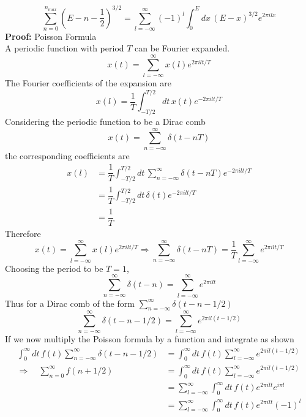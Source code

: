 \documentclass[aps,prb,onecolumn,notitlepage,showpacs,floatfix,superscriptaddress]{revtex4-1}
\begin{document}
\begin{equation}
\sum_{n=0}^{n_{max}}  \left(E - n - \dfrac{1}{2}\right)^{3/2}  = \sum_{l=-\infty}^\infty (-1)^l \int_0^E dx \, (E-x)^{3/2} e^{2\pi i l x}
\end{equation}
\noindent\makebox[\linewidth]{\rule{\textwidth}{0.4pt}}
\textbf{Proof:} Poisson Formula \\
A periodic function with period $T$ can be Fourier expanded.
\begin{equation}
x(t) = \sum_{l=-\infty}^\infty x(l) e^{2\pi i l t/T}
\end{equation}
The Fourier coefficients of the expansion are
\begin{equation}
x(l) = \dfrac{1}{T} \int_{-T/2}^{T/2} dt \, x(t) e^{-2\pi i l t/T}
\end{equation}
Considering the periodic function to be a Dirac comb
\begin{equation}
x(t) = \sum_{n=-\infty}^{\infty} \delta(t-n T)
\end{equation}
the corresponding coefficients are
\begin{equation}
\begin{split}
x(l) &= \dfrac{1}{T} \int_{-T/2}^{T/2} dt \, \sum_{n=-\infty}^{\infty} \delta(t-nT) e^{-2\pi i l t/T} \\
&= \dfrac{1}{T} \int_{-T/2}^{T/2} dt \, \delta(t) e^{-2\pi i l t/T} \\
&=\dfrac{1}{T}
\end{split}
\end{equation}
Therefore
\begin{equation}
x(t) = \sum_{l=-\infty}^\infty x(l) e^{2\pi i l t/T} \Rightarrow \sum_{n=-\infty}^{\infty} \delta(t-nT) = \dfrac{1}{T} \sum_{l=-\infty}^\infty  e^{2\pi i l t/T}
\end{equation}
Choosing the period to be $T=1$,
\begin{equation}
\sum_{n=-\infty}^{\infty} \delta(t-n) = \sum_{l=-\infty}^\infty  e^{2\pi i l t}
\end{equation}
Thus for a Dirac comb of the form $\sum_{n=-\infty}^{\infty} \delta(t-n -1/2) $
\begin{equation}
\sum_{n=-\infty}^{\infty} \delta(t-n-1/2) = \sum_{l=-\infty}^\infty  e^{2\pi i l (t-1/2)}
\end{equation}
If we now multiply the Poisson formula by a function and integrate as shown
\begin{equation}
\begin{split}
\int_0^\infty dt \, f(t) \sum_{n=-\infty}^{\infty} \delta(t-n-1/2) &= \int_0^\infty dt \, f(t) \sum_{l=-\infty}^\infty  e^{2\pi i l (t-1/2)} \\
\Rightarrow \quad  \sum_{n=0}^{\infty} f(n+1/2) & = \int_0^\infty dt \, f(t) \sum_{l=-\infty}^\infty  e^{2\pi i l (t-1/2)} \\
&= \sum_{l=-\infty}^\infty  \int_0^\infty dt \, f(t)  e^{2\pi i l t} e^{i\pi l} \\
&= \sum_{l=-\infty}^\infty  \int_0^\infty dt \, f(t)  e^{2\pi i l t} (-1)^l \\
\end{split}
\end{equation}
\end{document}
